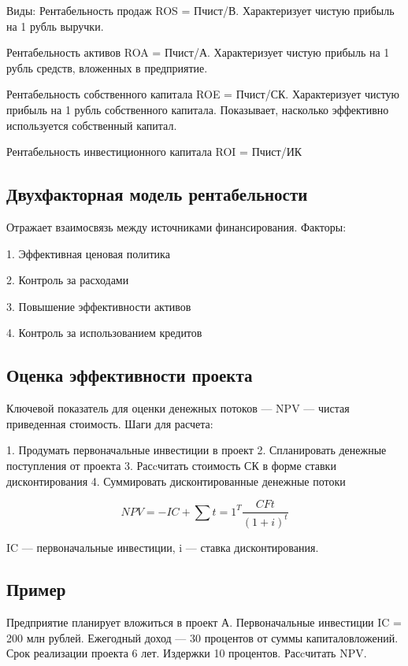 \documentclass[14pt]{extarticle}
\begin{document}
Виды:
Рентабельность продаж ROS = П{чист}/В. Характеризует чистую прибыль на 1 рубль выручки.

Рентабельность активов ROA = П{чист}/{А}. Характеризует чистую прибыль на 1 рубль средств, вложенных в предприятие.

Рентабельность собственного капитала ROE = П{чист}/{СК}. Характеризует чистую прибыль на 1 рубль собственного капитала. Показывает, насколько эффективно используется собственный капитал.

Рентабельность инвестиционного капитала ROI = П{чист}/{ИК}

\subsection{Двухфакторная модель рентабельности}
Отражает взаимосвязь между источниками финансирования. Факторы:

1. Эффективная ценовая политика

2. Контроль за расходами

3. Повышение эффективности активов

4. Контроль за использованием кредитов

\subsection{Оценка эффективности проекта}
Ключевой показатель для оценки денежных потоков — NPV — чистая приведенная стоимость. Шаги для расчета:

1. Продумать первоначальные инвестиции в проект
2. Спланировать денежные поступления от проекта
3. Расcчитать стоимость СК в форме ставки дисконтирования
4. Суммировать дисконтированные денежные потоки

$$
NPV = -IC + \sum{t = 1}^{T}{\frac{CFt}{(1+i)^t}}
$$

IC — первоначальные инвестиции, i — ставка дисконтирования.

\subsection{Пример}
Предприятие планирует вложиться в проект А. Первоначальные инвестиции IC = 200 млн рублей. Ежегодный доход — 30 процентов от суммы капиталовложений. Срок реализации проекта 6 лет. Издержки 10 процентов. Расcчитать NPV.
\end{document}
